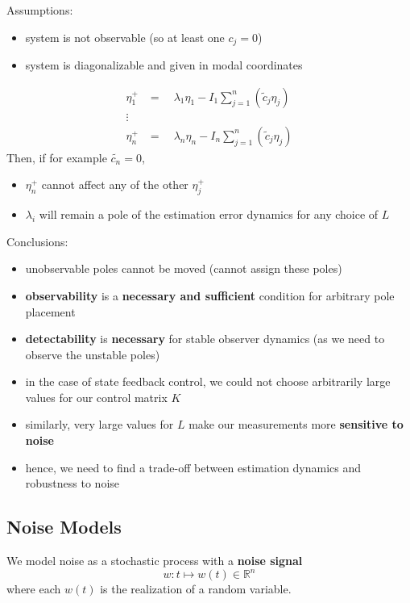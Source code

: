 
Assumptions:
\begin{itemize}
    \item system is not observable (so at least one $c_j=0$)
    \item system is diagonalizable and given in modal coordinates
\end{itemize}
\begin{align*}
    \eta_1^+ & =\quad\lambda_1\eta_1-I_1\sum_{j=1}^n\left(\tilde{c}_j\eta_j\right) \\
    \vdots                                                                         \\
    \eta_n^+ & =\quad\lambda_n\eta_n-I_n\sum_{j=1}^n\left(\tilde{c}_j\eta_j\right)
\end{align*}
Then, if for example $\tilde{c_n}=0$,
\begin{itemize}
    \item $\eta_n^+$ cannot affect any of the other $\eta_j^+$
    \item $\lambda_i$ will remain a pole of the estimation error dynamics for any choice of $L$
\end{itemize}
Conclusions:
\begin{itemize}
    \item unobservable poles cannot be moved (cannot assign these poles)
    \item \textbf{observability} is a \textbf{necessary and sufficient} condition for arbitrary pole placement
    \item \textbf{detectability} is \textbf{necessary} for stable observer dynamics (as we need to observe the unstable poles)
\end{itemize}


\begin{itemize}
    \item in the case of state feedback control, we could not choose arbitrarily large values for our control matrix $K$
    \item similarly, very large values for $L$ make our measurements more \textbf{sensitive to noise}
    \item hence, we need to find a trade-off between estimation dynamics and robustness to noise
\end{itemize}


\subsection{Noise Models}
We model noise as a stochastic process with a \textbf{noise signal}
\begin{equation*}
    w:t\mapsto w(t)\in\mathbb{R}^n
\end{equation*}where each $w(t)$ is the realization of a random variable.

